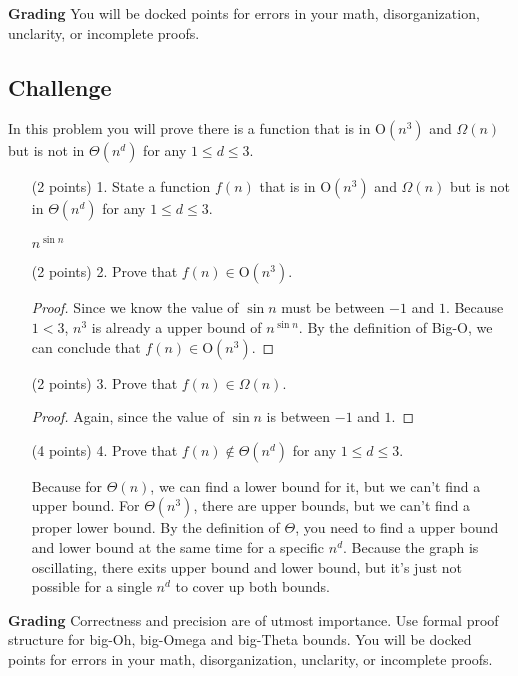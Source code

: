 \documentclass[paper=a4, fontsize=11pt]{scrartcl}
\numberwithin{equation}{section}		%
\numberwithin{figure}{section}			%
\numberwithin{table}{section}				%
\begin{document}
\noindent\textbf{Grading} You will be docked points for errors in your math, disorganization, unclarity, or incomplete proofs. 

\newpage

\subsection{Challenge}

In this problem you will prove there is a function that is in O$(n^3)$ and $\Omega(n)$ but is not in $\Theta(n^d)$ for any $1\leq d\leq 3$.  
\begin{enumerate}
\item [(2 points) 1.] State a function $f(n)$ that is in O$(n^3)$ and $\Omega(n)$ but is not in $\Theta(n^d)$ for any $1\leq d\leq 3$.

$n^{\sin n}$

\item [(2 points) 2.] Prove that $f(n) \in $O$(n^3)$.
\begin{proof}
	Since we know the value of $\sin n$ must be between $-1$ and $1$. Because $1 < 3$, $n^3$ is already a upper bound of $n^{\sin n}$. By the definition of Big-O, we can conclude that $f(n) \in $O$(n^3)$.
\end{proof}

\item [(2 points) 3.] Prove that $f(n) \in \Omega(n)$.
\begin{proof}
	Again, since the value of $\sin n$ is between $-1$ and $1$.
\end{proof}

\item [(4 points) 4.] Prove that $f(n) \not\in \Theta(n^d)$  for any $1\leq d\leq 3$.

Because for $\Theta(n)$, we can find a lower bound for it, but we can't find a upper bound. For $\Theta(n^3)$, there are upper bounds, but we can't find a proper lower bound. By the definition of $\Theta$, you need to find a upper bound and lower bound at the same time for a specific $n^d$. Because the graph is oscillating, there exits upper bound and lower bound, but it's just not possible for a single $n^d$ to cover up both bounds.
\end{enumerate}

\noindent\textbf{Grading} Correctness and precision are of utmost importance.  Use formal proof structure for big-Oh, big-Omega and big-Theta bounds.  You will be docked points for errors in your math, disorganization, unclarity, or incomplete proofs.    
\end{document}
